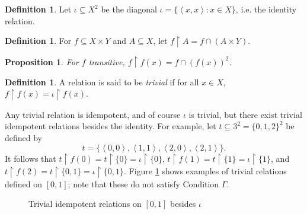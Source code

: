\documentclass{article}
\newcommand{\term}{\textit}
\newcommand{\tuple}[1]{\left\langle{#1}\right\rangle}
\newcommand{\rest}{\upharpoonright}
\theoremstyle{plain}
\newtheorem{proposition}[theorem]{Proposition}
\theoremstyle{definition}
\newtheorem{definition}[theorem]{Definition}
\theoremstyle{remark}
\begin{document}
\begin{definition}
  Let \(\iota\subseteq X^2\) be the diagonal
  \(\iota=\{\tuple{x,x}:x\in X\}\), i.e. the identity relation.
\end{definition}

\begin{definition}
  For \(f\subseteq X\times Y\) and \(A\subseteq X\), 
  let \(f\rest A=f\cap (A\times Y)\). 
\end{definition}

\begin{proposition}
  For \(f\) transitive, \(f\rest f(x)=f\cap (f(x))^2\).
\end{proposition}

\begin{definition}
  A relation is said to be \term{trivial} if for all
  \(x\in X\), \(f\rest f(x)=\iota \rest f(x)\).
\end{definition}

Any trivial relation is idempotent, and
of course \(\iota\) is trivial, but there exist trivial
idempotent relations besides the identity. For example, let
\(
  t\subseteq 3^2=\{0,1,2\}^2
\)
be defined by
\[
  t=\{\tuple{0,0},\tuple{1,1},\tuple{2,0},\tuple{2,1}\}
.\]
It follows that \(t\rest f(0)=t\rest\{0\}=\iota\rest\{0\}\),
\(t\rest f(1)=t\rest\{1\}=\iota\rest\{1\}\),
and \(t\rest f(2)=t\rest\{0,1\}=\iota\rest\{0,1\}\).
Figure \ref{trivialRelation} shows examples of trivial relations
defined on \([0,1]\); note that these do not satisfy Condition \(\Gamma\).

\begin{figure}
\begin{center}
\end{center}
\caption{Trivial idempotent relations on \([0,1]\) besides \(\iota\)}
\label{trivialRelation}
\end{figure}
\end{document}
